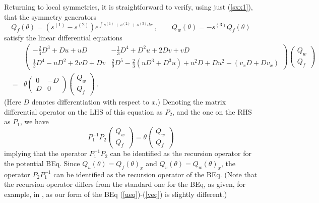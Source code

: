 \documentclass[12pt]{article}
\begin{document}
Returning to local symmetries, 
it is straightforward to verify, using just (\ref{sxx1}),  that the symmetry generators
$$ Q_f(\theta) =  (s^{(1)}-s^{(2)})e^{\int s^{(1)}+s^{(2)}+s^{(3)}dx} \ ,\qquad 
Q_w(\theta)= -s^{(3)}Q_f(\theta)  $$
satisfy the linear differential equations 
\begin{eqnarray*}
&& \left( \begin{array}{cc}
- \frac{2}{3}D^3 + Du + uD   &
-\frac{1}{3}D^4 + D^2u + 2Dv + vD   \\
 \frac{1}{3}D^4 - uD^2 + 2vD + Dv    & 
\frac{2}{9}D^5 - \frac{2}{3} (uD^3 +D^3u) + u^2D + Du^2 - (v_xD + Dv_x) 
\end{array} \right) 
\left( \begin{array}{c}
 Q_w \\
 Q_f 
\end{array} \right)  \\
&=&
\theta
\left( \begin{array}{cc}
 0 & -D  \\
 D  &  0 
\end{array} \right) 
\left( \begin{array}{c}
 Q_w \\
 Q_f 
\end{array} \right)\ .
\end{eqnarray*}
(Here $D$ denotes differentiation with respect to $x$.) Denoting the matrix differential operator on the LHS of this
equation as $P_2$, and the one on the RHS as $P_1$, we have
$$ P_1^{-1} P_2 
\left( \begin{array}{c}
 Q_w \\
 Q_f 
\end{array} \right)
= \theta
\left( \begin{array}{c}
 Q_w \\
 Q_f 
\end{array} \right)  $$
implying that the operator $P_1^{-1} P_2$ can be identified as the  recursion operator \cite{Olver}
for the potential BEq.
Since $Q_u(\theta)=Q_f(\theta)_x$ and $Q_v(\theta)=Q_w(\theta)_x$, 
the operator $P_2 P_1^{-1}$ can be identified as the recursion operator of the BEq. 
(Note that the recursion operator differs from the standard one for the BEq,
as given, for example, in \cite{olverbook}, as our form of the BEq (\ref{ueq})-(\ref{veq}) is
slightly different.)

\end{document}
